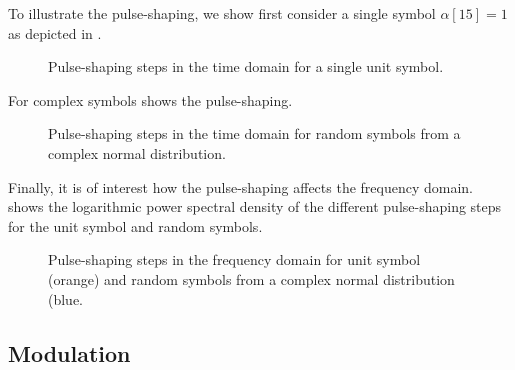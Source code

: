 To illustrate the pulse-shaping, we show first consider a single symbol $\alpha[15]=1$ as depicted in .
\begin{figure}[htb]
	\centering
	
	\caption{Pulse-shaping steps in the time domain for a single unit symbol.}\label{fig:pulse_shaping_unit_time}
\end{figure}
For complex symbols  shows the pulse-shaping.
\begin{figure}[htb]
	\centering
	
	\caption{Pulse-shaping steps in the time domain for random symbols from a complex normal distribution.}\label{fig:pulse_shaping_rand_time}
\end{figure}
Finally, it is of interest how the pulse-shaping affects the frequency domain.
 shows the logarithmic power spectral density of the different pulse-shaping steps for the unit symbol and random symbols.
\begin{figure}[htb]
	\centering
	
	\caption{Pulse-shaping steps in the frequency domain for unit symbol (orange) and random symbols from a complex normal distribution (blue.}\label{fig:pulse_shaping_freq}
\end{figure}

\FloatBarrier
\subsection{Modulation}

